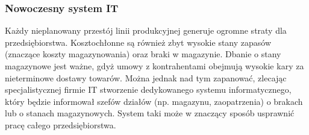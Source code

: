 \subsubsection{Nowoczesny system IT}
Każdy nieplanowany przestój linii produkcyjnej generuje ogromne straty dla przedsiębiorstwa. Kosztochłonne są również zbyt wysokie stany zapasów (znaczące koszty magazynowania) oraz braki w magazynie. Dbanie o stany magazynowe jest ważne, gdyż umowy z kontrahentami obejmują wysokie kary za nieterminowe dostawy towarów. Można jednak nad tym zapanować, zlecając specjalistycznej firmie IT stworzenie dedykowanego systemu informatycznego, który będzie informował szefów działów (np. magazynu, zaopatrzenia) o brakach lub o stanach magazynowych. System taki może w znaczący sposób usprawnić pracę całego przedsiębiorstwa.